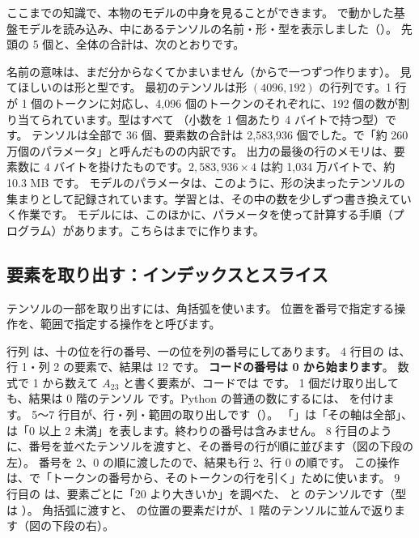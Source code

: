 ここまでの知識で、本物のモデルの中身を見ることができます。
で動かした基盤モデルを読み込み、中にあるテンソルの名前・形・型を表示しました（）。
先頭の 5 個と、全体の合計は、次のとおりです。


名前の意味は、まだ分からなくてかまいません（からで一つずつ作ります）。
見てほしいのは形と型です。
最初のテンソルは形 $(4096,192)$ の行列です。1 行が 1 個のトークンに対応し、4,096 個のトークンのそれぞれに、192 個の数が割り当てられています。型はすべて （小数を 1 個あたり 4 バイトで持つ型）です。
テンソルは全部で 36 個、要素数の合計は 2,583,936 個でした。で「約 260 万個のパラメータ」と呼んだものの内訳です。
出力の最後の行のメモリは、要素数に 4 バイトを掛けたものです。$2{,}583{,}936\times 4$ は約 1,034 万バイトで、約 10.3 MB です。
モデルのパラメータは、このように、形の決まったテンソルの集まりとして記録されています。学習とは、その中の数を少しずつ書き換えていく作業です。
モデルには、このほかに、パラメータを使って計算する手順（プログラム）があります。こちらはまでに作ります。

\subsection*{要素を取り出す：インデックスとスライス}

テンソルの一部を取り出すには、角括弧を使います。
位置を番号で指定する操作を、範囲で指定する操作をと呼びます。

{\par}


行列  は、十の位を行の番号、一の位を列の番号にしてあります。
4 行目の  は、行 1・列 2 の要素で、結果は 12 です。
\textbf{コードの番号は 0 から始まります}。
数式で 1 から数えて $A_{23}$ と書く要素が、コードでは  です。
1 個だけ取り出しても、結果は 0 階のテンソル  です。Python の普通の数にするには、 を付けます。
5〜7 行目が、行・列・範囲の取り出しです（）。
「\code{:}」は「その軸は全部」、 は「0 以上 2 未満」を表します。終わりの番号は含みません。
8 行目のように、番号を並べたテンソルを渡すと、その番号の行が順に並びます（図の下段の左）。
番号を 2、0 の順に渡したので、結果も行 2、行 0 の順です。
この操作は、で「トークンの番号から、そのトークンの行を引く」ために使います。
9 行目の  は、要素ごとに「20 より大きいか」を調べた、 と  のテンソルです（型は ）。
角括弧に渡すと、 の位置の要素だけが、1 階のテンソルに並んで返ります（図の下段の右）。

